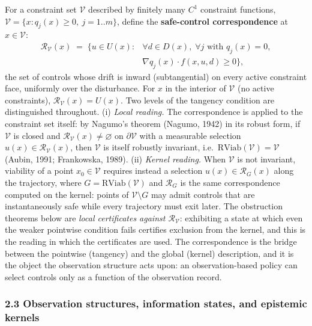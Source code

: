 \documentclass[10pt,twocolumn]{article}
\theoremstyle{definition}
\begin{document}
For a constraint set \(\mathcal{V}\) described by finitely many \(C^1\)
constraint functions,
\(\mathcal{V} = \{ x : q_j(x) \ge 0,\ j = 1..m \}\), define the
\textbf{safe-control correspondence} at \(x \in \mathcal{V}\):
\[
\begin{aligned}
\mathcal{R}_{\mathcal{V}}(x) \;=\; \bigl\{ u \in U(x) : {}& \forall d \in D(x),\; \forall j \text{ with } q_j(x) = 0,\\
& \nabla q_j(x) \cdot f(x, u, d) \ge 0 \bigr\},
\end{aligned}
\]
the set of controls whose drift is inward (subtangential) on every
active constraint face, uniformly over the disturbance. For \(x\) in the
interior of \(\mathcal{V}\) (no active constraints),
\(\mathcal{R}_{\mathcal{V}}(x) = U(x)\). Two levels of the tangency condition are distinguished throughout. (i) \emph{Local reading.} The correspondence is applied to the constraint set itself: by Nagumo's theorem (Nagumo, 1942) in its robust form, if \(\mathcal{V}\) is closed and
\(\mathcal{R}_{\mathcal{V}}(x) \neq \varnothing\) on
\(\partial\mathcal{V}\) with a measurable selection
\(u(x) \in \mathcal{R}_{\mathcal{V}}(x)\), then \(\mathcal{V}\) is
itself robustly invariant,
i.e.~\(\mathrm{RViab}(\mathcal{V}) = \mathcal{V}\) (Aubin, 1991;
Frankowska, 1989). (ii) \emph{Kernel reading.} When \(\mathcal{V}\) is not invariant, viability of a point \(x_0 \in \mathcal{V}\) requires instead a selection \(u(x) \in \mathcal{R}_G(x)\) along the trajectory, where \(G = \mathrm{RViab}(\mathcal{V})\) and \(\mathcal{R}_G\) is the same correspondence computed on the kernel: points of
\(\mathcal{V} \setminus G\) may admit controls that are instantaneously
safe while every trajectory must exit later. The obstruction
theorems below are \emph{local certificates against
\(\mathcal{R}_{\mathcal{V}}\)}: exhibiting a state at which even the
weaker pointwise condition fails certifies exclusion from the kernel,
and this is the reading in which the certificates are used. The
correspondence is the bridge between the pointwise (tangency) and the
global (kernel) description, and it is the object the observation
structure acts upon: an observation-based policy can select controls
only as a function of the observation record.

\subsubsection{2.3 Observation structures, information states, and
epistemic
kernels}\label{observation-structures-information-states-and-epistemic-kernels}
\end{document}
